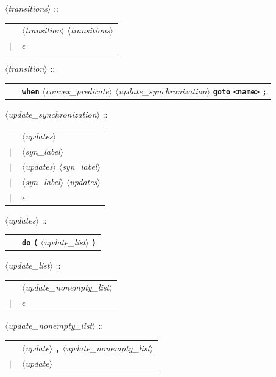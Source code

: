 \documentclass[a4paper,10pt]{article}
\newcommand{\emptystring}{$\epsilon$}
\newcommand{\nt}[1]{$\langle$\emph{#1}$\rangle$}
\newcommand{\regleGrammaire}[1]{\bigskip \noindent \nt{#1} :: \\}
\newcommand{\code}[1]{\textbf{\texttt{#1}}}
\begin{document}
\regleGrammaire{transitions}
\begin{tabular}{l l}
	\  & \nt{transition} \nt{transitions} \\
	$|$ & \emptystring \\
\end{tabular}

\regleGrammaire{transition}
\begin{tabular}{l l}
	\  & \code{when} \nt{convex\_predicate} \nt{update\_synchronization} \code{goto} \code{<name>} \code{;} \\
\end{tabular}

\regleGrammaire{update\_synchronization}
\begin{tabular}{l l}
	\  & \nt{updates} \\
	$|$ & \nt{syn\_label} \\
	$|$ & \nt{updates} \nt{syn\_label} \\
	$|$ & \nt{syn\_label} \nt{updates} \\
	$|$ & \emptystring \\
\end{tabular}

\regleGrammaire{updates}
\begin{tabular}{l l}
	\  & \code{do} \code{(} \nt{update\_list} \code{)} \\
\end{tabular}

\regleGrammaire{update\_list}
\begin{tabular}{l l}
	\  & \nt{update\_nonempty\_list} \\
	$|$ & \emptystring \\
\end{tabular}

\regleGrammaire{update\_nonempty\_list}
\begin{tabular}{l l}
	\  & \nt{update} \code{,} \nt{update\_nonempty\_list} \\
	$|$ & \nt{update} \\
\end{tabular}
\end{document}
